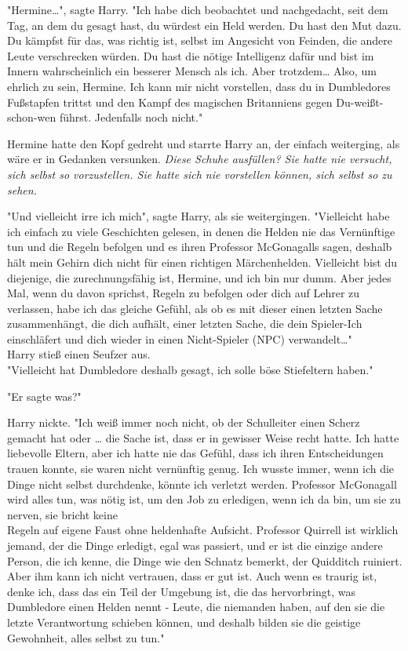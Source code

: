 {"Hermine…", sagte Harry. "Ich habe dich beobachtet und nachgedacht, seit dem Tag, an dem du gesagt hast, du würdest ein Held werden. Du hast den Mut dazu. Du kämpfst für das, was richtig ist, selbst im Angesicht von Feinden, die andere Leute verschrecken würden. Du hast die nötige Intelligenz dafür und bist im Innern wahrscheinlich ein besserer Mensch als ich. Aber trotzdem… Also, um ehrlich zu sein, Hermine. Ich kann mir nicht vorstellen, dass du in Dumbledores Fußstapfen trittst und den Kampf des magischen Britanniens gegen Du-weißt-schon-wen führst. Jedenfalls noch nicht."

Hermine hatte den Kopf gedreht und starrte Harry an, der einfach weiterging, als wäre er in Gedanken versunken. \emph{Diese Schuhe ausfüllen? Sie hatte nie versucht, sich selbst so vorzustellen. Sie hatte sich nie vorstellen können, sich selbst so zu sehen.}

"Und vielleicht irre ich mich", sagte Harry, als sie weitergingen. "Vielleicht habe ich einfach zu viele Geschichten gelesen, in denen die Helden nie das Vernünftige tun und die Regeln befolgen und es ihren Professor McGonagalls sagen, deshalb hält mein Gehirn dich nicht für einen richtigen Märchenhelden. Vielleicht bist du diejenige, die zurechnungsfähig ist, Hermine, und ich bin nur dumm. Aber jedes Mal, wenn du davon sprichst, Regeln zu befolgen oder dich auf Lehrer zu verlassen, habe ich das gleiche Gefühl, als ob es mit dieser einen letzten Sache zusammenhängt, die dich aufhält, einer letzten Sache, die dein Spieler-Ich einschläfert und dich wieder in einen Nicht-Spieler (NPC) verwandelt…"\\ Harry stieß einen Seufzer aus.\\ "Vielleicht hat Dumbledore deshalb gesagt, ich solle böse Stiefeltern haben."

"Er sagte was?"

Harry nickte. "Ich weiß immer noch nicht, ob der Schulleiter einen Scherz gemacht hat oder … die Sache ist, dass er in gewisser Weise recht hatte. Ich hatte liebevolle Eltern, aber ich hatte nie das Gefühl, dass ich ihren Entscheidungen trauen konnte, sie waren nicht vernünftig genug. Ich wusste immer, wenn ich die Dinge nicht selbst durchdenke, könnte ich verletzt werden. Professor McGonagall wird alles tun, was nötig ist, um den Job zu erledigen, wenn ich da bin, um sie zu nerven, sie bricht keine\\ Regeln auf eigene Faust ohne heldenhafte Aufsicht. Professor Quirrell ist wirklich jemand, der die Dinge erledigt, egal was passiert, und er ist die einzige andere Person, die ich kenne, die Dinge wie den Schnatz bemerkt, der Quidditch ruiniert. Aber ihm kann ich nicht vertrauen, dass er gut ist. Auch wenn es traurig ist, denke ich, dass das ein Teil der Umgebung ist, die das hervorbringt, was Dumbledore einen Helden nennt - Leute, die niemanden haben, auf den sie die letzte Verantwortung schieben können, und deshalb bilden sie die geistige Gewohnheit, alles selbst zu tun."

}
